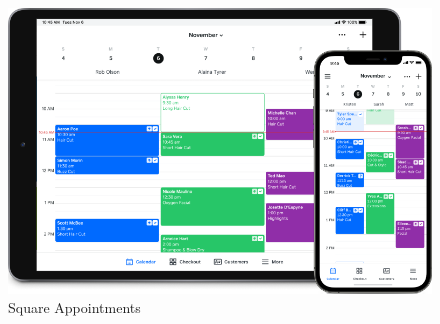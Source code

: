 \begin{figure}
    \centering
    \includegraphics[width=1.0\textwidth]{content/existing_reservation_systems/square_appointments.png}
    \caption[Square Appointments]{Square Appointments~\cite{square}}
    \label{fig:square_appointments}
\end{figure}
